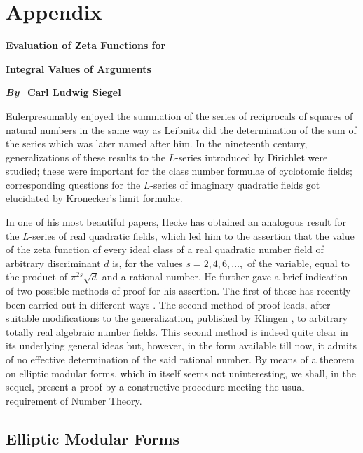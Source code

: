 


\chapter{Appendix}

\begin{center}
{\huge\bf Evaluation of Zeta Functions for}
\medskip

{\huge\bf Integral Values of Arguments}
\end{center}
\bigskip

\centerline{{\large\bf\em By} \ \large\bf Carl Ludwig Siegel}
\bigskip

Euler\pageoriginale presumably enjoyed the summation of the series of
reciprocals of squares of natural numbers in the same way as Leibnitz
did the determination of the sum of the series which was later named
after him. In the nineteenth century, generalizations of these results
to the $L$-series introduced by Dirichlet were studied; these were
important for the class number formulae of cyclotomic fields;
corresponding questions for the $L$-series of imaginary quadratic
fields got elucidated by Kronecker's limit formulae.

In one of his most beautiful papers, Hecke has obtained an analogous
result for the $L$-series of real quadratic fields, which led him to
the assertion that the value of the zeta function of every ideal class
of a real quadratic number field of arbitrary discriminant $d$ is, for
the values $s=2,4,6,\ldots,$ of the variable, equal to the product of
$\pi^{2s}\sqrt{d}$ and a rational number. He further gave a brief
indication of two possible methods of proof for his assertion. The
first of these has recently been carried out in different ways
\cite{app-key1}. The second method of proof leads, after suitable
modifications to the generalization, published by Klingen \cite{app-key2}, to
arbitrary totally real algebraic number fields. This second method is
indeed quite clear in its underlying general ideas but, however, in
the form available till now, it admits of no effective determination
of the said rational number. By means of a theorem on elliptic modular
forms, which in itself seems not uninteresting, we shall, in the
sequel, present a proof by a constructive procedure meeting the usual
requirement of Number Theory.


\setcounter{section}{0}
\section{Elliptic Modular Forms}\label{app-sec1}

